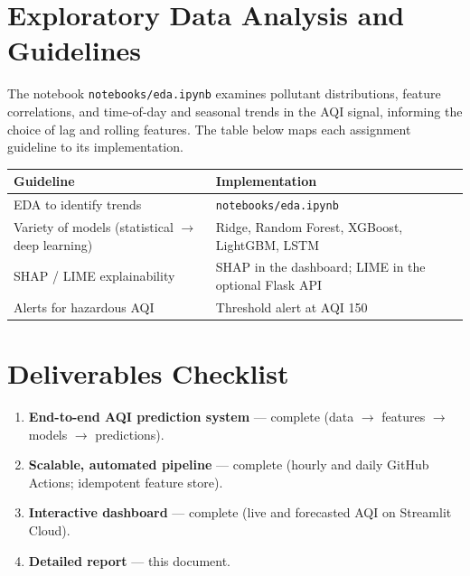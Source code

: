 \documentclass[11pt,a4paper]{article}
\begin{document}
\section{Exploratory Data Analysis and Guidelines}
The notebook \texttt{notebooks/eda.ipynb} examines pollutant distributions,
feature correlations, and time-of-day and seasonal trends in the AQI signal,
informing the choice of lag and rolling features. The table below maps each
assignment guideline to its implementation.

\begin{center}
\begin{tabular}{@{}p{6.0cm}p{8.0cm}@{}}
\toprule
\textbf{Guideline} & \textbf{Implementation} \\
\midrule
EDA to identify trends & \texttt{notebooks/eda.ipynb} \\
Variety of models (statistical $\rightarrow$ deep learning) & Ridge, Random Forest, XGBoost, LightGBM, LSTM \\
SHAP / LIME explainability & SHAP in the dashboard; LIME in the optional Flask API \\
Alerts for hazardous AQI & Threshold alert at AQI 150 \\
\bottomrule
\end{tabular}
\end{center}

\section{Deliverables Checklist}
\begin{enumerate}[leftmargin=1.6em]
  \item \textbf{End-to-end AQI prediction system} --- complete
        (data $\rightarrow$ features $\rightarrow$ models $\rightarrow$ predictions).
  \item \textbf{Scalable, automated pipeline} --- complete (hourly and daily
        GitHub Actions; idempotent feature store).
  \item \textbf{Interactive dashboard} --- complete (live and forecasted AQI on
        Streamlit Cloud).
  \item \textbf{Detailed report} --- this document.
\end{enumerate}
\end{document}
